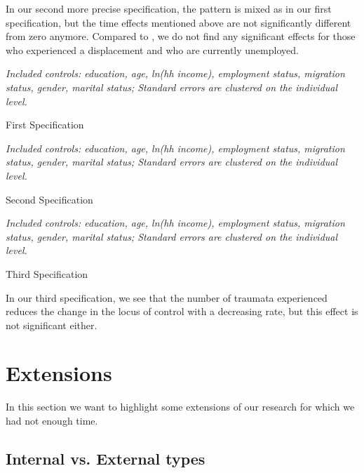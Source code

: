 \documentclass[12pt, a4paper, fleqn, parskip]{scrartcl}
\begin{document}
In our second more precise specification, the pattern is mixed as in our first
specification, but the time effects mentioned above are not significantly
different from zero anymore. Compared to \citet{preuss2017}, we do not find any
significant effects for those who experienced a displacement and who are
currently unemployed.

\begin{table}[H]
	\tiny{}
	\footnotesize \textit{Included controls: education, age, ln(hh income),
	employment status, migration status, gender, marital status; Standard
	errors are clustered on the individual level.}
	\caption{First Specification}
	\label{tab:first_reg}
\end{table}
\newpage


\begin{table}[H]
	\tiny{}
	\footnotesize \textit{Included controls: education, age, ln(hh income),
	employment status, migration status, gender, marital status; Standard
	errors are clustered on the individual level.}
	\caption{Second Specification}
	\label{tab:second_reg}
\end{table}
\newpage

\begin{table}[H]
	
	\footnotesize \textit{Included controls: education, age, ln(hh income),
	employment status, migration status, gender, marital status; Standard
	errors are clustered on the individual level.}
	\caption{Third Specification}
	\label{tab:third_reg}
\end{table}
\newpage

In our third specification, we see that the number of traumata experienced
reduces the change in the locus of control with a decreasing rate, but this
effect is not significant either.


\section{Extensions} %
\label{sec:extensions}

In this section we want to highlight some extensions of our research for which
we had not enough time.

\subsection{Internal vs. External types} %
\label{sub:internal_vs_external_types}
\end{document}
